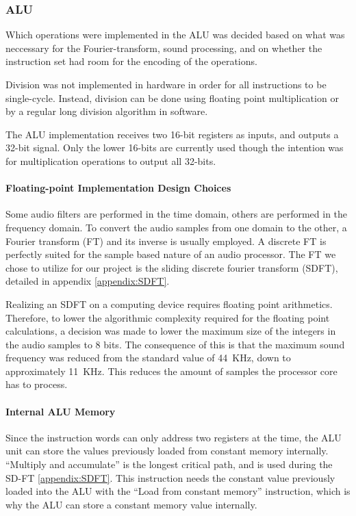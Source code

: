 \FloatBarrier
\subsubsection{ALU}\label{subsec:fpga-alu}

Which operations were implemented in the ALU was decided based on what
was neccessary for the Fourier-transform, sound processing, and on whether the
instruction set had room for the encoding of the operations.

Division was not implemented in hardware in order for all instructions to be
single-cycle. Instead, division can be done using floating point multiplication
or by a regular long division algorithm in software.

The ALU implementation receives two 16-bit registers as inputs, and outputs a
32-bit signal. Only the lower 16-bits are currently used though
the intention was for multiplication operations to output all 32-bits.

\paragraph{Floating-point Implementation Design Choices}

Some audio filters are performed in the time domain, others are performed in the
frequency domain. To convert the audio samples from one domain to the other, a
Fourier transform (FT) and its inverse is usually employed. A discrete FT is
perfectly suited for the sample based nature of an audio processor. The FT we
chose to utilize for our project is the
sliding discrete fourier transform (SDFT), detailed in appendix \ref{appendix:SDFT}.

Realizing an SDFT on a computing device requires floating point arithmetics.
Therefore, to lower the algorithmic complexity required for the floating point
calculations, a decision was made to lower the maximum size of the integers in
the audio samples to 8 bits. The consequence of this is that the maximum sound
frequency was reduced from the standard value of 44~KHz, down to approximately 11~KHz.
This reduces the amount of samples the processor core has to process.

\paragraph{Internal ALU Memory}

Since the instruction words can only address two registers at the time, the ALU
unit can store the values previously loaded from constant memory internally.
``Multiply and accumulate'' is the longest critical path, and is used
during the SD-FT \ref{appendix:SDFT}. This instruction needs the constant value
previously loaded into the ALU with the ``Load from constant memory''
instruction, which is why the ALU can store a constant memory value internally.
